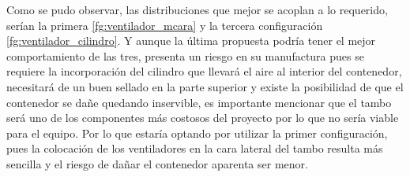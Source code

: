  Como se pudo observar, las distribuciones que mejor se acoplan a lo requerido, serían la primera \ref{fg:ventilador_mcara} y la tercera configuración \ref{fg:ventilador_cilindro}. Y aunque la última propuesta podría tener el mejor comportamiento de las tres, presenta un riesgo en su manufactura pues se requiere la incorporación del cilindro que llevará el aire al interior del contenedor, necesitará de un buen sellado en la parte superior y existe la posibilidad de que el contenedor se dañe quedando inservible, es importante mencionar que el tambo será uno de los componentes más costosos del proyecto por lo que no sería viable para el equipo. Por lo que estaría optando por utilizar la primer configuración, pues la colocación de los ventiladores en la cara lateral del tambo resulta más sencilla  y el riesgo de dañar el contenedor aparenta ser menor.